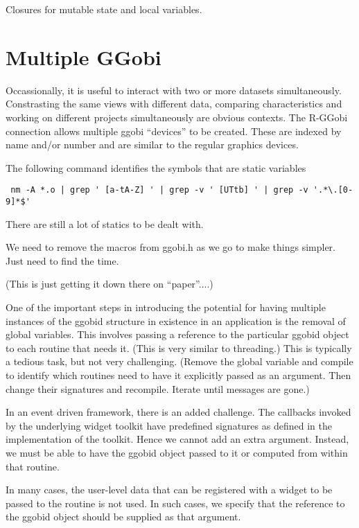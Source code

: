 Closures for mutable state and local variables.



\section{Multiple GGobi}
Occassionally, it is useful to interact with two or more datasets
simultaneously. Constrasting the same views with different data,
comparing characteristics and working on different projects
simultaneously are obvious contexts. The R-GGobi connection allows
multiple ggobi ``devices'' to be created.  These are indexed by name
and/or number and are similar to the regular graphics devices.


The following command identifies
the symbols that are static variables
\begin{verbatim}
 nm -A *.o | grep ' [a-tA-Z] ' | grep -v ' [UTtb] ' | grep -v '.*\.[0-9]*$'
\end{verbatim}

There are still a lot of statics to be dealt with.

We need to remove the macros from ggobi.h as we go to
make things simpler. Just need to find the time.

(This is just getting it down there on ``paper''....)



One of the important steps in introducing the potential for having
multiple instances of the ggobid structure in existence in an
application is the removal of global variables.  This involves passing
a reference to the particular ggobid object to each routine that needs
it. (This is very similar to threading.)  This is typically a tedious
task, but not very challenging.  (Remove the global variable and
compile to identify which routines need to have it explicitly passed
as an argument.  Then change their signatures and recompile.  Iterate
until messages are gone.)

In an event driven framework, there is an added challenge.  The
callbacks invoked by the underlying widget toolkit have predefined
signatures as defined in the implementation of the toolkit.  Hence we
cannot add an extra argument.  Instead, we must be able to have the
ggobid object passed to it or computed from within that routine.

In many cases, the user-level data that can be registered with a
widget to be passed to the routine is not used.  In such cases, we
specify that the reference to the ggobid object should be supplied as
that argument.

